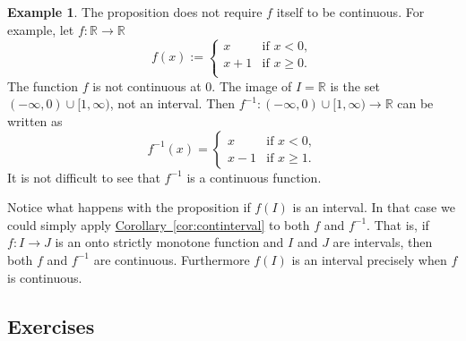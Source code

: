 \documentclass[12pt]{book}
\newcommand{\R}{{\mathbb{R}}}
\theoremstyle{plain}
\newtheorem{cor}[thm]{Corollary}
\theoremstyle{remark}
\theoremstyle{definition}
\theoremstyle{exercise}
\theoremstyle{example}
\newtheorem{example}[thm]{Example}
\newcommand{\exerciseref}[1]{\hyperref[#1]{Exercise~\ref*{#1}}}
\newcommand{\propref}[1]{\hyperref[#1]{Proposition~\ref*{#1}}}
\newcommand{\corref}[1]{\hyperref[#1]{Corollary~\ref*{#1}}}
\begin{document}
\begin{example}
The proposition does not require $f$ itself to be continuous.  For example, let
$f \colon \R \to \R$
\begin{equation*}
f(x) :=
\begin{cases}
x & \text{if $x < 0$}, \\
x+1 & \text{if $x \geq 0$}. \\
\end{cases}
\end{equation*}
The function $f$ is not continuous at $0$.
The image of $I = \R$ is the set 
$(-\infty,0)\cup [1,\infty)$, not an interval.
Then $f^{-1} \colon (-\infty,0)\cup [1,\infty)
\to \R$ can be written as
\begin{equation*}
f^{-1}(x) =
\begin{cases}
x & \text{if $x < 0$}, \\
x-1 & \text{if $x \geq 1$}. 
\end{cases}
\end{equation*}
It is not difficult to see that $f^{-1}$ is a continuous function.
\end{example}

Notice what happens with the proposition if $f(I)$ is an interval.  In that case we could simply
apply \corref{cor:continterval} to both $f$ and $f^{-1}$.  That is, if
$f \colon I \to J$ is an onto strictly monotone function and $I$ and $J$ are intervals,
then both $f$ and $f^{-1}$ are continuous.  Furthermore $f(I)$ is an
interval precisely when $f$ is continuous.

%
%

\subsection{Exercises}
\end{document}
